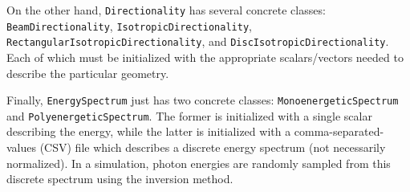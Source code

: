 \par On the other hand, \texttt{Directionality} has several concrete classes: \texttt{BeamDirectionality}, \texttt{IsotropicDirectionality}, \texttt{RectangularIsotropicDirectionality}, and \texttt{DiscIsotropicDirectionality}. Each of which must be initialized with the appropriate scalars/vectors needed to describe the particular geometry.

\par Finally, \texttt{EnergySpectrum} just has two concrete classes: \texttt{MonoenergeticSpectrum} and \texttt{PolyenergeticSpectrum}. The former is initialized with a single scalar describing the energy, while the latter is initialized with a comma-separated-values (CSV) file which describes a discrete energy spectrum (not necessarily normalized). In a simulation, photon energies are randomly sampled from this discrete spectrum using the inversion method.
